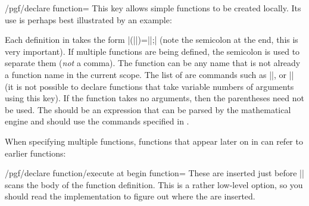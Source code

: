 \begin{key}{/pgf/declare function=}
    This key allows simple functions to be created locally. Its use is perhaps
    best illustrated by an example:
\begin{codeexample}[]
\end{codeexample}

    Each definition in  takes the form
    |(||)=||;| (note the semicolon
    at the end, this is very important). If multiple functions are being
    defined, the semicolon is used to separate them (\emph{not} a comma). The
    function  can be any name that is not already a function name in
    the current scope. The list of  are commands such as |\x|,
    or |\y| (it is not possible to declare functions that take variable numbers
    of arguments using this key). If the function takes no arguments, then the
    parentheses need not be used. The  should be an expression
    that can be parsed by the mathematical engine and should use the commands
    specified in .

    When specifying multiple functions, functions that appear later on in
     can refer to earlier functions:
\begin{codeexample}[pre={\pgfmathsetseed{1}}]
\end{codeexample}
\end{key}

\begin{key}{/pgf/declare function/execute at begin function=}
    These  are inserted just before |\pgfmathdeclarefunction|
    scans the body of the function definition.  This is a rather low-level
    option, so you should read the implementation to figure out where the
     are inserted.
\end{key}

